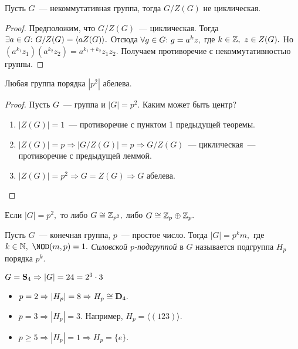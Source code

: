         \begin{lemma}
            Пусть $G$~--- некоммутативная группа, тогда ${G/Z(G)}$ не циклическая.
        \end{lemma}
        \begin{proof}
            Предположим, что ${G/Z(G)}$~--- циклическая. Тогда ${\exists a \in G{:}{ } \  G/Z(G) = \langle aZ(G) \rangle.}$ Отсюда ${\forall g \in G{:}{ } \  g = a^kz,}$ где ${k \in \mathbb{Z}, \ z \in Z(G).}$ Но ${(a^{k_1}z_1)(a^{k_2}z_2) = a^{k_1+k_2}z_1z_2.}$ Получаем противоречие с некоммутативностью группы.
        \end{proof}
        \newpage
        \begin{theorem}
            Любая группа порядка $|p^2|$ абелева.
        \end{theorem}
        \begin{proof}
            Пусть $G$~--- группа и ${|G| = p^2.}$ Каким может быть центр?
            \begin{enumerate}
            \setlength\itemsep{0.1em}
                \item ${|Z(G)| = 1}$~--- противоречие с пунктом 1 предыдущей теоремы.
                \item ${|Z(G)| = p \Rightarrow |G/Z(G)| = p \Rightarrow G/Z(G)}$~--- циклическая~--- противоречие с предыдущей леммой.
                \item ${|Z(G)| = p^2 \Rightarrow G = Z(G) \Rightarrow G}$ абелева. \qedhere
            \end{enumerate}
        \end{proof}
        \begin{consequence*}
            Если ${|G| = p^2,}$ то либо ${G \cong \mathbb{Z}_{p^2},}$ либо ${G \cong \mathbb{Z}_p \oplus \mathbb{Z}_p.}$
        \end{consequence*}
        \begin{definition}
            Пусть $G$~--- конечная группа, $p$~--- простое число. Тогда ${|G| = p^km,}$ где ${k \in \naturals, \ \NOD(m,p) = 1.}$ \textit{Силовской $p$-подгруппой} в $G$ называется подгруппа $H_p$ порядка $p^k$.
        \end{definition}
        \begin{exmpl*}
            ${G = \mathbf{S}_4 \Rightarrow |G| = 24 = 2^3 \cdot 3}$
            \begin{itemize}
            \setlength\itemsep{0.1em}
                \item ${p = 2 \Rightarrow |H_p| = 8 \Rightarrow H_p \cong \mathbf{D}_4.}$
                \item ${p = 3 \Rightarrow |H_p| = 3.}$ Например, ${H_p = \langle(123)\rangle.}$
                \item ${p \geqslant 5 \Rightarrow |H_p| = 1 \Rightarrow H_p = \{e\}.}$
            \end{itemize}
        \end{exmpl*}
